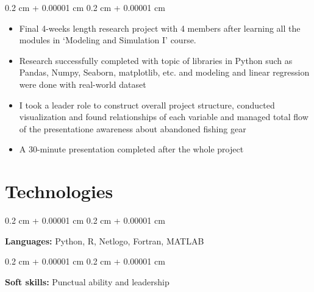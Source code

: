 \documentclass[10pt, letterpaper]{article}
\newenvironment{highlights}{
    \begin{itemize}[
        topsep=0.10 cm,
        parsep=0.10 cm,
        partopsep=0pt,
        itemsep=0pt,
        leftmargin=0.4 cm + 10pt
    ]
}{
    \end{itemize}
} %
\newenvironment{onecolentry}{
    \begin{adjustwidth}{
        0.2 cm + 0.00001 cm
    }{
        0.2 cm + 0.00001 cm
    }
}{
    \end{adjustwidth}
} %
\begin{document}
        \vspace{0.10 cm}
        \begin{onecolentry}
            \begin{highlights}
                \item Final 4-weeks length research project with 4 members after learning all the modules in ‘Modeling and Simulation I’ course.
                \item Research successfully completed with topic of libraries in Python such as Pandas, Numpy, Seaborn, matplotlib, etc. and modeling and linear regression were done with real-world dataset
                \item I took a leader role to construct overall project structure, conducted visualization and found relationships of each variable and managed total flow of the presentatione awareness about abandoned fishing gear
                \item A 30-minute presentation completed after the whole project
                
            \end{highlights}
        \end{onecolentry}




    
    \section{Technologies}



        
        \begin{onecolentry}
            \textbf{Languages:} Python, R, Netlogo, Fortran, MATLAB \end{onecolentry}

        \vspace{0.2 cm}

        \begin{onecolentry}
            \textbf{Soft skills:} Punctual ability and leadership 
        \end{onecolentry}


    
\end{document}
